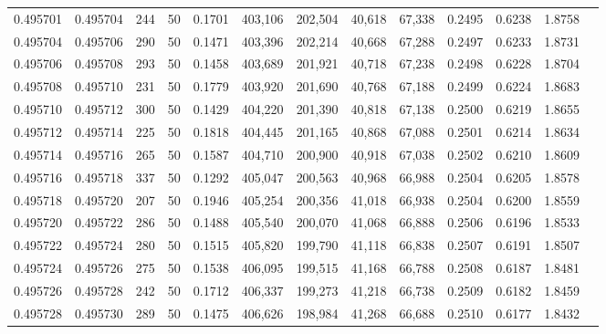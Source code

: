 \begin{tabular}{rrrrrrrrrrrrr}
0.495701 & 0.495704 &   244 &  50 &                                     0.1701 & 403,106 & 202,504 &  40,618 &  67,338 & 0.2495 & 0.6238 & 1.8758 \\
0.495704 & 0.495706 &   290 &  50 &                                     0.1471 & 403,396 & 202,214 &  40,668 &  67,288 & 0.2497 & 0.6233 & 1.8731 \\
0.495706 & 0.495708 &   293 &  50 &                                     0.1458 & 403,689 & 201,921 &  40,718 &  67,238 & 0.2498 & 0.6228 & 1.8704 \\
0.495708 & 0.495710 &   231 &  50 &                                     0.1779 & 403,920 & 201,690 &  40,768 &  67,188 & 0.2499 & 0.6224 & 1.8683 \\
0.495710 & 0.495712 &   300 &  50 &                                     0.1429 & 404,220 & 201,390 &  40,818 &  67,138 & 0.2500 & 0.6219 & 1.8655 \\
0.495712 & 0.495714 &   225 &  50 &                                     0.1818 & 404,445 & 201,165 &  40,868 &  67,088 & 0.2501 & 0.6214 & 1.8634 \\
0.495714 & 0.495716 &   265 &  50 &                                     0.1587 & 404,710 & 200,900 &  40,918 &  67,038 & 0.2502 & 0.6210 & 1.8609 \\
0.495716 & 0.495718 &   337 &  50 &                                     0.1292 & 405,047 & 200,563 &  40,968 &  66,988 & 0.2504 & 0.6205 & 1.8578 \\
0.495718 & 0.495720 &   207 &  50 &                                     0.1946 & 405,254 & 200,356 &  41,018 &  66,938 & 0.2504 & 0.6200 & 1.8559 \\
0.495720 & 0.495722 &   286 &  50 &                                     0.1488 & 405,540 & 200,070 &  41,068 &  66,888 & 0.2506 & 0.6196 & 1.8533 \\
0.495722 & 0.495724 &   280 &  50 &                                     0.1515 & 405,820 & 199,790 &  41,118 &  66,838 & 0.2507 & 0.6191 & 1.8507 \\
0.495724 & 0.495726 &   275 &  50 &                                     0.1538 & 406,095 & 199,515 &  41,168 &  66,788 & 0.2508 & 0.6187 & 1.8481 \\
0.495726 & 0.495728 &   242 &  50 &                                     0.1712 & 406,337 & 199,273 &  41,218 &  66,738 & 0.2509 & 0.6182 & 1.8459 \\
0.495728 & 0.495730 &   289 &  50 &                                     0.1475 & 406,626 & 198,984 &  41,268 &  66,688 & 0.2510 & 0.6177 & 1.8432 \\

\end{tabular}

